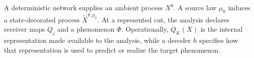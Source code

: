 A deterministic network supplies an ambient process $X^\theta$. A source law $\mu_0$ induces a state-decorated process $\widetilde X^{\theta,\mu_0}$. At a represented cut, the analysis declares receiver maps $Q_j$ and a phenomenon $\Phi$. Operationally, $Q_K(X)$ is the internal representation made available to the analysis, while a decoder $h$ specifies how that representation is used to predict or realize the target phenomenon.

